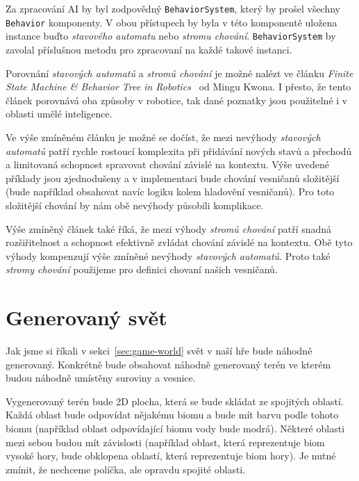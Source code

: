 Za zpracování AI by byl zodpovědný \texttt{BehaviorSystem}, který by prošel všechny \texttt{Behavior} komponenty. V obou přístupech by byla v této komponentě uložena instance buďto \textit{stavového automatu} nebo \textit{stromu chování}. \texttt{BehaviorSystem} by zavolal příslušnou metodu pro zpracovaní na každé takové instanci.


Porovnání \textit{stavových automatů} a \textit{stromů chování} je možné nalézt ve článku \textit{Finite State Machine \& Behavior Tree in Robotics}~\cite{FMTAndBTInRobotics} od Mingu Kwona. I přesto, že tento článek porovnává oba způsoby v robotice, tak dané poznatky jsou použitelné i v oblasti umělé inteligence.

Ve výše zmíněném článku je možné se dočíst, že mezi nevýhody \textit{stavových automatů} patří rychle rostoucí komplexita při přidávání nových stavů a přechodů a limitovaná schopnost spravovat chování závislé na kontextu. Výše uvedené příklady jsou zjednodušeny a v implementaci bude chování vesničanů složitější (bude například obsahovat navíc logiku kolem hladovění vesničanů). Pro toto složitější chování by nám obě nevýhody působili komplikace.

Výše zmíněný článek také říká, že mezi výhody \textit{stromů chování} patří snadná rozšiřitelnost a schopnost efektivně zvládat chování závislé na kontextu. Obě tyto výhody kompenzují výše zmíněné nevýhody \textit{stavových automatů}. Proto také \textit{stromy chování} použijeme pro definici chovaní našich vesničanů.

\section{Generovaný svět}
\label{sec:terrain}
Jak jsme si říkali v sekci~\ref{sec:game-world} svět v naší hře bude náhodně generovaný. Konkrétně bude obsahovat náhodně generovaný terén ve kterém budou náhodně umístěny suroviny a vesnice.

Vygenerovaný terén bude 2D plocha, která se bude skládat ze spojitých oblastí. Každá oblast bude odpovídat nějakému biomu a bude mít barvu podle tohoto biomu (například oblast odpovídající biomu vody bude modrá). Některé oblasti mezi sebou budou mít závislosti (například oblast, která reprezentuje biom vysoké hory, bude obklopena oblastí, která reprezentuje biom hory). Je nutné zmínit, že nechceme políčka, ale opravdu spojité oblasti.

